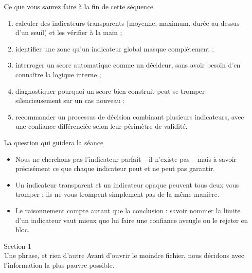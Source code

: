 \documentclass[aspectratio=169]{beamer}
\begin{document}
\begin{frame}{Ce que vous saurez faire à la fin de cette séquence}
  \begin{enumerate}
    \item calculer des indicateurs transparents (moyenne, maximum, durée au-dessus d'un seuil) et les vérifier à la main ;
    \item identifier une zone qu'un indicateur global masque complètement ;
    \item interroger un score automatique comme un décideur, sans avoir besoin d'en connaître la logique interne ;
    \item diagnostiquer pourquoi un score bien construit peut se tromper silencieusement sur un cas nouveau ;
    \item recommander un processus de décision combinant plusieurs indicateurs, avec une confiance différenciée selon leur périmètre de validité.
  \end{enumerate}
\end{frame}

\begin{frame}{La question qui guidera la séance}
  \begin{itemize}
    \item Nous ne cherchons pas l'indicateur parfait -- il n'existe pas -- mais à savoir précisément ce que chaque indicateur peut et ne peut pas garantir.
    \item Un indicateur transparent et un indicateur opaque peuvent tous deux vous tromper ; ils ne vous trompent simplement pas de la même manière.
    \item Le raisonnement compte autant que la conclusion : savoir nommer la limite d'un indicateur vaut mieux que lui faire une confiance aveugle ou le rejeter en bloc.
  \end{itemize}
\end{frame}

\begin{frame}[plain]
  \centering
  \Huge Section 1\\[3mm]
  \Large Une phrase, et rien d'autre
  \vfill
  \normalsize Avant d'ouvrir le moindre fichier, nous décidons avec l'information la plus pauvre possible.
\end{frame}
\end{document}
